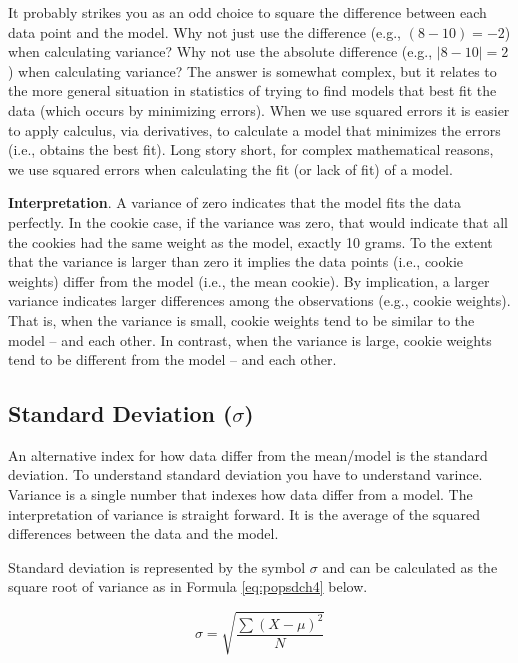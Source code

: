 \documentclass[
]{krantz}
\begin{document}
It probably strikes you as an odd choice to square the difference between each data point and the model. Why not just use the difference (e.g., \((8 - 10) = -2\)) when calculating variance? Why not use the absolute difference (e.g., \(|8 - 10|= 2\)) when calculating variance? The answer is somewhat complex, but it relates to the more general situation in statistics of trying to find models that best fit the data (which occurs by minimizing errors). When we use squared errors it is easier to apply calculus, via derivatives, to calculate a model that minimizes the errors (i.e., obtains the best fit). Long story short, for complex mathematical reasons, we use squared errors when calculating the fit (or lack of fit) of a model.

\textbf{Interpretation}. A variance of zero indicates that the model fits the data perfectly. In the cookie case, if the variance was zero, that would indicate that all the cookies had the same weight as the model, exactly 10 grams. To the extent that the variance is larger than zero it implies the data points (i.e., cookie weights) differ from the model (i.e., the mean cookie). By implication, a larger variance indicates larger differences among the observations (e.g., cookie weights). That is, when the variance is small, cookie weights tend to be similar to the model -- and each other. In contrast, when the variance is large, cookie weights tend to be different from the model -- and each other.

\hypertarget{standard-deviation-sigma}{%
\subsection{\texorpdfstring{Standard Deviation (\(\sigma\))}{Standard Deviation (\textbackslash sigma)}}\label{standard-deviation-sigma}}

An alternative index for how data differ from the mean/model is the standard deviation. To understand standard deviation you have to understand varince. Variance is a single number that indexes how data differ from a model. The interpretation of variance is straight forward. It is the average of the squared differences between the data and the model.

Standard deviation is represented by the symbol \(\sigma\) and can be calculated as the square root of variance as in Formula \eqref{eq:popsdch4} below.

\begin{equation} 
\sigma = \sqrt{\frac{\sum{(X - \mu)^2}}{N}}
      \label{eq:popsdch4}
\end{equation}
\end{document}
